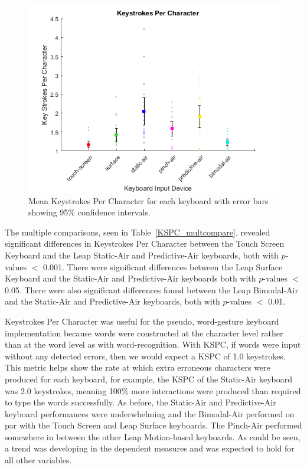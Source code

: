 \begin{figure}[h]
	\centering
	\includegraphics{fig_KSPC_mean}
	\caption[Mean Keystrokes Per Character]{Mean Keystrokes Per Character for each keyboard with error bars showing 95\% confidence intervals.}
	\label{fig_KSPC_mean}
\end{figure}

The multiple comparisons, seen in Table~\ref{KSPC_multcompare}, revealed significant differences in Keystrokes Per Character between the Touch Screen Keyboard and the Leap Static-Air and Predictive-Air keyboards, both with $p$-values $<$ 0.001. There were significant differences between the Leap Surface Keyboard and the Static-Air and Predictive-Air keyboards both with $p$-values $<$ 0.05. There were also significant differences found between the Leap Bimodal-Air and the Static-Air and Predictive-Air keyboards, both with $p$-values $<$ 0.01.

Keystrokes Per Character was useful for the pseudo, word-gesture keyboard implementation because words were constructed at the character level rather than at the word level as with word-recognition. With KSPC, if words were input without any detected errors, then we would expect a KSPC of 1.0 keystrokes. This metric helps show the rate at which extra erroneous characters were produced for each keyboard, for example, the KSPC of the Static-Air keyboard was 2.0 keystrokes, meaning 100\% more interactions were produced than required to type the words successfully. As before, the Static-Air and Predictive-Air keyboard performances were underwhelming and the Bimodal-Air performed on par with the Touch Screen and Leap Surface keyboards. The Pinch-Air performed somewhere in between the other Leap Motion-based keyboards. As could be seen, a trend was developing in the dependent measures and was expected to hold for all other variables.


